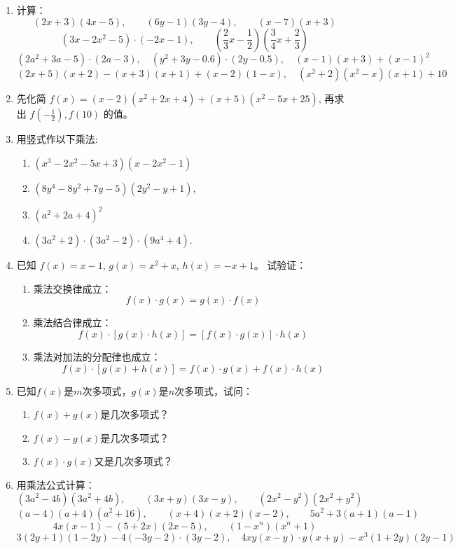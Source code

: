 \begin{enumerate}
\item 计算：
\[(2x+3)(4x-5),\qquad  (6y-1)(3y-4),\qquad  (x-7)(x+3)\]
\[(3x-2x^2-5)\cdot (-2x-1),\qquad  \left(\frac{2}{3} x-\frac{1}{2}\right)\left(\frac{3}{4} x+\frac{2}{3}\right)\]
\[\left(2 a^{2}+3 a-5\right) \cdot(2 a-3),\quad  \left(y^{2}+3 y-0.6\right) \cdot(2 y-0.5),\quad  (x-1)(x+3)+(x-1)^{2}\]
\[(2 x+5)(x+2)-(x+3)(x+1)+(x-2)(1-x),\quad  \left(x^{2}+2\right)\left(x^{2}-x\right)(x+1)+10\]


\item 先化简 $f(x)=(x-2)\left(x^{2}+2 x+4\right)+(x+5)(x^{2}-5 x+25)$, 再求出 $f\left(-\frac{1}{2}\right), f(10)$ 的值。
\item 用竖式作以下乘法:
\begin{enumerate}
    \item $\left(x^{3}-2 x^{2}-5 x+3\right)\left(x-2 x^{2}-1\right)$
    \item $\left(8 y^{4}-8 y^{2}+7 y-5\right)\left(2 y^{2}-y+1\right)$,
    \item $\left(a^{2}+2 a+4\right)^{2}$
    \item $\left(3 a^{2}+2\right) \cdot\left(3 a^{2}-2\right) \cdot\left(9 a^{4}+4\right)$.
\end{enumerate}

\item 已知 $f(x)=x-1$, $g(x)=x^{2}+x$, $h(x)=-x+1$。
试验证：
\begin{enumerate}
    \item 乘法交换律成立： $$f(x) \cdot g(x)=g(x) \cdot f(x)$$
    \item 乘法结合律成立： $$f(x) \cdot[g(x) \cdot h(x)]=[f(x) \cdot g(x)] \cdot h(x)$$
    \item 乘法对加法的分配律也成立：$$f(x) \cdot[g(x) + h(x)]=f(x) \cdot g(x)+f(x) \cdot h(x)$$
\end{enumerate}

\item 已知$f(x)$是$m$次多项式，$g(x)$是$n$次多项式，试问：
\begin{enumerate}
    \item $f(x)+g(x)$是几次多项式？
    \item $f(x)-g(x)$是几次多项式？
    \item $f(x)·g(x)$又是几次多项式？
\end{enumerate}

\item 用乘法公式计算：
\[(3a^2-4b) (3a^2+4b),\qquad  (3x+y) (3x-y),\qquad  (2x^2-y^2) (2x^2+y^2)\]
\[(a-4) (a+4)(a^2+16),\qquad  (x+4) (x+2)(x-2),\qquad  5a^2+3 (a+1) (a-1)\]
\[4x (x-1) - (5+2x) (2x-5),\qquad  (1-x^n) (x^n+1)\]
\[  3 (2y+1) (1-2y)-4(-3y-2)\cdot (3y-2),\quad  4xy (x-y) \cdot y (x+y) - x^3 (1+2y) (2y-1)\]


\end{enumerate}
